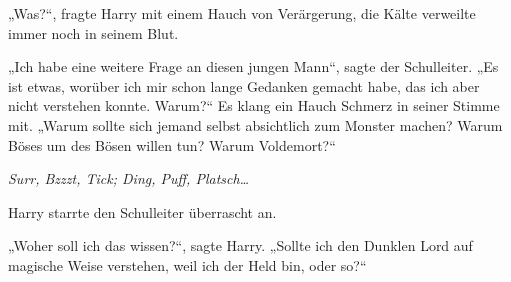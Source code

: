 „Was?“, fragte Harry mit einem Hauch von Verärgerung, die Kälte verweilte immer noch in seinem Blut.

„Ich habe eine weitere Frage an diesen jungen Mann“, sagte der Schulleiter. „Es ist etwas, worüber ich mir schon lange Gedanken gemacht habe, das ich aber nicht verstehen konnte. Warum?“ Es klang ein Hauch Schmerz in seiner Stimme mit. „Warum sollte sich jemand selbst absichtlich zum Monster machen? Warum Böses um des Bösen willen tun? Warum Voldemort?“

\later

\emph{Surr, Bzzzt, Tick; Ding, Puff, Platsch…}

Harry starrte den Schulleiter überrascht an.

„Woher soll ich das wissen?“, sagte Harry. „Sollte ich den Dunklen Lord auf magische Weise verstehen, weil ich der Held bin, oder so?“

